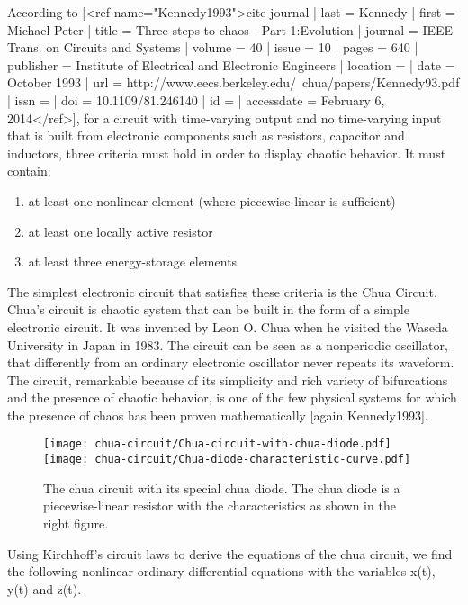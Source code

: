 \documentclass[main]{subfiles}
\begin{document}
According to [<ref name="Kennedy1993">{{cite journal
  | last = Kennedy
  | first = Michael Peter
  | title = Three steps to chaos - Part 1:Evolution
  | journal = IEEE Trans. on Circuits and Systems
  | volume = 40
  | issue = 10
  | pages = 640
  | publisher = Institute of Electrical and Electronic Engineers 
  | location = 
  | date = October 1993
  | url = http://www.eecs.berkeley.edu/~chua/papers/Kennedy93.pdf
  | issn = 
  | doi = 10.1109/81.246140
  | id = 
  | accessdate = February 6, 2014}}</ref>], for a circuit with time-varying output and no time-varying input that is built from electronic components such as resistors, capacitor and inductors, three criteria must hold in order to display chaotic behavior. It must contain:
  \begin{enumerate}
  \item at least one nonlinear element (where piecewise linear is sufficient)
  \item at least one locally active resistor
  \item at least three energy-storage elements
  \end{enumerate}
  
The simplest electronic circuit that satisfies these criteria is the Chua Circuit. Chua's circuit is chaotic system that can be built in the form of a simple electronic circuit. It was invented by Leon O. Chua when he visited the Waseda University in Japan in 1983. The circuit can be seen as a nonperiodic oscillator, that differently from an ordinary electronic oscillator never repeats its waveform. The circuit, remarkable because of its simplicity and rich variety of bifurcations and the presence of chaotic behavior, is one of the few physical systems for which the presence of chaos has been proven mathematically [again Kennedy1993].

\begin{figure}[H]
\centering
\texttt{[image: chua-circuit/Chua-circuit-with-chua-diode.pdf]}
\texttt{[image: chua-circuit/Chua-diode-characteristic-curve.pdf]}
\caption[The chua circuit]{The chua circuit with its special chua diode. The chua diode is a piecewise-linear resistor with the characteristics as shown in the right figure.}
\label{figure:chuacircuit}
\end{figure}

Using Kirchhoff's circuit laws to derive the equations of the chua circuit, we find the following nonlinear ordinary differential equations with the variables x(t), y(t) and z(t).
\end{document}
